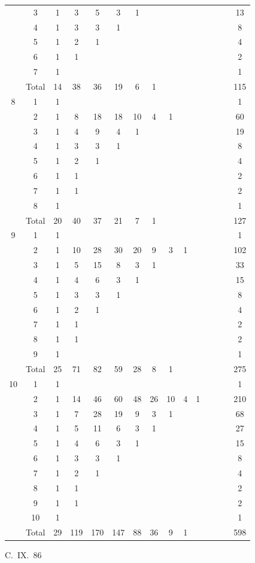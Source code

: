 \documentclass[11pt,a4paper]{book}
\begin{document}
{\begin{center}
\begin{longtable}{|c|c|c|c|c|c|c|c|c|c|c|c|c|c|c|}
  & 3 & 1 & 3 & 5 & 3 & 1 & & & & & & & & 13 \\
  & 4 & 1 & 3 & 3 & 1 & & & & & & & & & 8 \\
  & 5 & 1 & 2 & 1 & & & & & & & & & & 4 \\
  & 6 & 1 & 1 & & & & & & & & & & & 2 \\
  & 7 & 1 & & & & & & & & & & & & 1 \\
  & Total & 14 & 38 & 36 & 19 & 6 & 1 & & & & & & & 115 \\
\hline
8 & 1 & 1 & & & & & & & & & & & & 1 \\
  & 2 & 1 & 8 & 18 & 18 & 10 & 4 & 1 & & & & & & 60 \\
  & 3 & 1 & 4 & 9 & 4 & 1 & & & & & & & & 19 \\
  & 4 & 1 & 3 & 3 & 1 & & & & & & & & & 8 \\
  & 5 & 1 & 2 & 1 & & & & & & & & & & 4 \\
  & 6 & 1 & 1 & & & & & & & & & & & 2 \\
  & 7 & 1 & 1 & & & & & & & & & & & 2 \\
  & 8 & 1 & & & & & & & & & & & & 1 \\
  & Total & 20 & 40 & 37 & 21 & 7 & 1 & & & & & & & 127 \\
\hline
9 & 1 & 1 & & & & & & & & & & & & 1 \\
  & 2 & 1 & 10 & 28 & 30 & 20 & 9 & 3 & 1 & & & & & 102 \\
  & 3 & 1 & 5 & 15 & 8 & 3 & 1 & & & & & & & 33 \\
  & 4 & 1 & 4 & 6 & 3 & 1 & & & & & & & & 15 \\
  & 5 & 1 & 3 & 3 & 1 & & & & & & & & & 8 \\
  & 6 & 1 & 2 & 1 & & & & & & & & & & 4 \\
  & 7 & 1 & 1 & & & & & & & & & & & 2 \\
  & 8 & 1 & 1 & & & & & & & & & & & 2 \\
  & 9 & 1 & & & & & & & & & & & & 1 \\
  & Total & 25 & 71 & 82 & 59 & 28 & 8 & 1 & & & & & & 275 \\
\hline
10 & 1 & 1 & & & & & & & & & & & & 1 \\
  & 2 & 1 & 14 & 46 & 60 & 48 & 26 & 10 & 4 & 1 & & & & 210 \\
  & 3 & 1 & 7 & 28 & 19 & 9 & 3 & 1 & & & & & & 68 \\
  & 4 & 1 & 5 & 11 & 6 & 3 & 1 & & & & & & & 27 \\
  & 5 & 1 & 4 & 6 & 3 & 1 & & & & & & & & 15 \\
  & 6 & 1 & 3 & 3 & 1 & & & & & & & & & 8 \\
  & 7 & 1 & 2 & 1 & & & & & & & & & & 4 \\
  & 8 & 1 & 1 & & & & & & & & & & & 2 \\
  & 9 & 1 & 1 & & & & & & & & & & & 2 \\
  & 10 & 1 & & & & & & & & & & & & 1 \\
  & Total & 29 & 119 & 170 & 147 & 88 & 36 & 9 & 1 & & & & & 598 \\
\hline
\end{longtable}
\end{center}
\hfill C.~IX.\ 86

}
\end{document}
